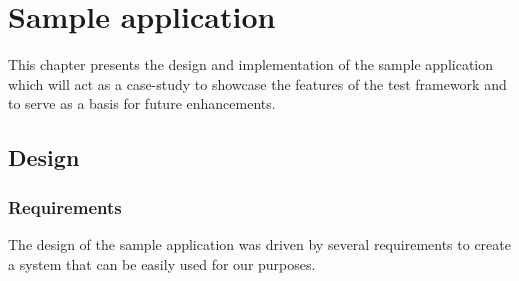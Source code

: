 \chapter{Sample application}

This chapter presents the design and implementation of the sample application which will act as a case-study to showcase the features of the test framework and to serve as a basis for future enhancements. 


\section{Design} \label{design}

\subsection{Requirements} \label{sample-app-requirements}


The design of the sample application was driven by several requirements to create a system that can be easily used for our purposes.

